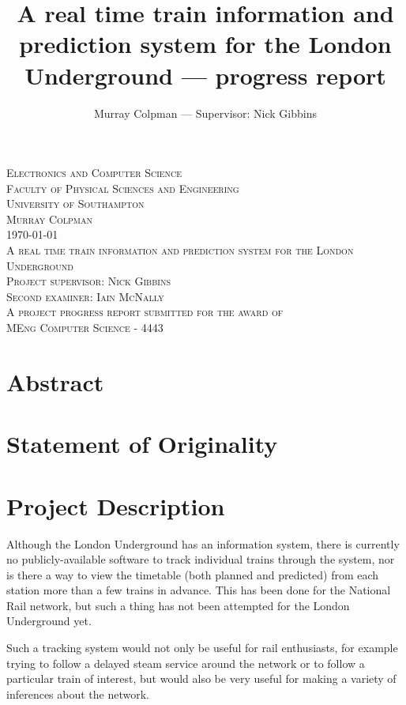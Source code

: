 \documentclass[a4paper,12pt]{article}
\title{A real time train information and prediction system for the London Underground --- progress report}
\author{Murray Colpman --- Supervisor: Nick Gibbins}
\begin{document}
\begin{titlepage}
  \begin{center}
    \textsc{\Large Electronics and Computer Science}\\
    \textsc{\Large Faculty of Physical Sciences and Engineering}\\
    \textsc{\Large University of Southampton}\\[1.5cm]
    \textsc{\Large Murray Colpman}\\
    \textsc{\Large \today}\\[1.5cm]
    \textsc{\LARGE A real time train information and prediction system for the London Underground}\\[1.5cm]
    \textsc{\large Project supervisor: Nick Gibbins}\\
    \textsc{\large Second examiner: Iain McNally}\\[1.5cm]
    \textsc{\large A project progress report submitted for the award of}\\
    \textsc{\large MEng Computer Science - 4443}
  \end{center}
\end{titlepage}

\section*{Abstract}

\pagebreak

\tableofcontents

\pagebreak

\section*{Statement of Originality}

\pagebreak

\section{Project Description}

Although the London Underground has an information system, there is currently
no publicly-available software to track individual trains through the system,
nor is there a way to view the timetable (both planned and predicted) from each
station more than a few trains in advance. This has been done for the National
Rail network, but such a thing has not been attempted for the London
Underground yet.

Such a tracking system would not only be useful for rail enthusiasts, for
example trying to follow a delayed steam service around the network or to
follow a particular train of interest, but would also be very useful for making
a variety of inferences about the network.
\end{document}
